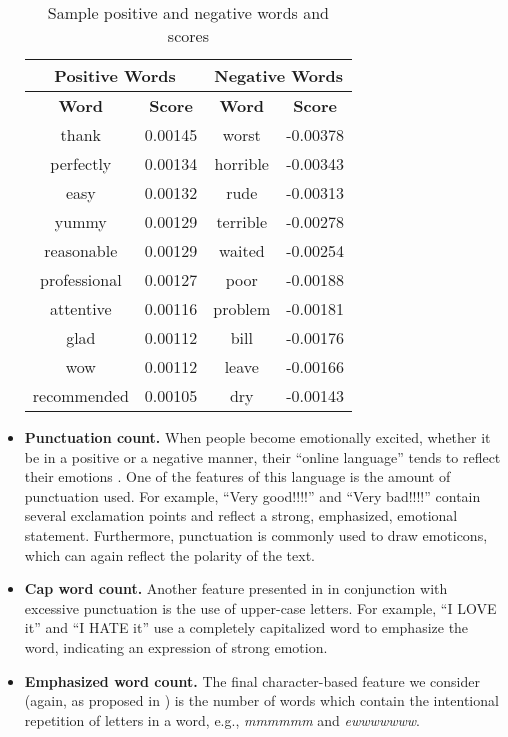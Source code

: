 \begin{itemize}
\begin{table}[!h]
\centering
\begin{tabular}{|c|c||c|c|}
\hline
\multicolumn{2}{|c||}{\bf Positive Words} & \multicolumn{2}{|c|}{\bf Negative Words}\\
\hline
\bf Word & \bf Score & \bf Word & \bf Score\\
\hline
thank & 0.00145 & worst & -0.00378\\
perfectly & 0.00134 & horrible & -0.00343\\
easy & 0.00132 & rude & -0.00313\\
yummy & 0.00129 & terrible & -0.00278\\
reasonable & 0.00129 & waited & -0.00254\\
professional & 0.00127 & poor & -0.00188\\
attentive & 0.00116 & problem & -0.00181\\
glad & 0.00112 & bill & -0.00176\\
wow & 0.00112 & leave & -0.00166\\
recommended & 0.00105 & dry & -0.00143\\
\hline
\end{tabular}
\caption{Sample positive and negative words and scores}
\label{posneglist}
\end{table}

\item {\bf Punctuation count.} When people become emotionally excited, whether it be in a positive or a negative manner, their ``online language'' tends to reflect their emotions \cite{emotion}. One of the features of this language is the amount of punctuation used. For example, ``Very good!!!!'' and ``Very bad!!!!'' contain several exclamation points and reflect a strong, emphasized, emotional statement. Furthermore, punctuation is commonly used to draw emoticons, which can again reflect the polarity of the text.

\item {\bf Cap word count.} Another feature presented in \cite{emotion} in conjunction with excessive punctuation is the use of upper-case letters. For example, ``I LOVE it'' and ``I HATE it'' use a completely capitalized word to emphasize the word, indicating an expression of strong emotion.

\item {\bf Emphasized word count.} The final character-based feature we consider (again, as proposed in \cite{emotion}) is the number of words which contain the intentional repetition of letters in a word, e.g., \emph{mmmmmm} and \emph{ewwwwwww}.


\end{itemize}
